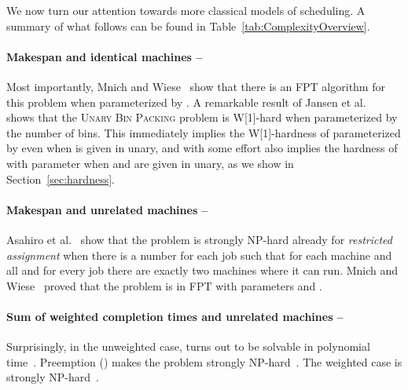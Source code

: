 \documentclass{llncs}
\newcommand{\FPT}{{\sf FPT}\xspace}
\newcommand{\NP}{{\sf NP}\xspace}
\newcommand{\W}[1]{{\sf W}[#1]\xspace}
\begin{document}
We now turn our attention towards more classical models of scheduling. A summary of what follows can be found in Table~\ref{tab:ComplexityOverview}.

\paragraph{Makespan and identical machines -- }
Most importantly, Mnich and Wiese~\cite{MnichW:14} show that there is an \FPT algorithm for this problem when parameterized by . A remarkable result of Jansen et al.~\cite{JansenKMS:13} shows that the \textsc{Unary Bin Packing} problem is \W{1}-hard when parameterized by the number of bins. This immediately implies the \W{1}-hardness of  parameterized by  even when  is given in unary, and with some effort also implies the hardness of  with parameter  when  and  are given in unary, as we show in Section~\ref{sec:hardness}.

\paragraph{Makespan and unrelated machines -- }
Asahiro et al.~\cite{AsahiroJMOZ:07} show that the problem  is strongly \NP-hard already for \textit{restricted assignment} when there is a number  for each job such that for each machine  and all  and for every job there are exactly two machines where it can run. Mnich and Wiese~\cite{MnichW:14} proved that the problem is in \FPT with parameters  and .
 
\paragraph{Sum of weighted completion times and unrelated machines -- }

Surprisingly, in the unweighted case,  turns out to be solvable in polynomial time~\cite{Bruno:74,Horn:73}. Preemption () makes the problem strongly \NP-hard~\cite{Sitters:05}. The weighted case  is strongly \NP-hard~\cite[Problem SS13]{GareyJ:79}.
\end{document}
